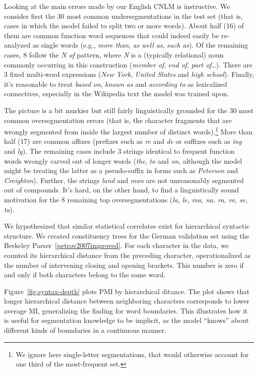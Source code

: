 Looking at the main errors made by our English CNLM is instructive. We
consider first the 30 most common undersegmentations in the test set
(that is, cases in which the model failed to split two or more
words). About half (16) of them are common function word sequences
that could indeed easily be re-analyzed as single words (e.g.,
\emph{more than}, \emph{as well as}, \emph{such as}). Of the remaining
cases, 8 follow the \emph{N of} pattern, where \emph{N} is a
(typically relational) noun commonly occurring in this construction
(\emph{member of}, \emph{end of}, \emph{part of}\ldots). There are 3
fixed multi-word expressions (\emph{New York}, \emph{United States}
and \emph{high school}). Finally, it's reasonable to treat \emph{based
  on}, \emph{known as} and \emph{according to} as lexicalized
connectives, especially in the Wikipedia text the model was trained
upon.

The picture is a bit murkier but still fairly linguistically grounded
for the 30 most common oversegmentation errors (that is, the character
fragments that are wrongly segmented from inside the largest number of
distinct words).\footnote{We ignore here single-letter segmentations,
  that would otherwise account for one third of the most-frequent
  set.}  More than half (17) are common affixes (prefixes such as
\emph{re} and \emph{de} or suffixes such as \emph{ing} and
\emph{ly}). The remaining cases include 3 strings identical to frequent
function words wrongly carved out of longer words (\emph{the},
\emph{to} and \emph{on}, although the model might be treating the
latter as a pseudo-suffix in forms such as \emph{Peterson} and
\emph{Creighton}). Further, the strings \emph{land} and \emph{man} are not
unreasonably segmented out of compounds. It's hard, on the other hand,
to find a linguistically sound motivation for the 8 remaining top
oversegmentations (\emph{la, le, ma, na, ra, ro, se, ta}).

We hypothesized that similar statistical correlates exist for hierarchical syntactic structure.
We created constituency trees for the German validation set using the Berkeley Parser~\ref{petrov2007improved}.
For each character in the data, we counted its hierarchical distance from the preceding character, operationalized as the number of intervening closing and opening brackets.
This number is zero if and only if both characters belong to the same word.

Figure~\ref{fig:syntax-depth} plots PMI by hierarchical ditance.
The plot shows that longer hierarchical distance between neighboring characters corresponds to lower average MI, generalizing the finding for word boundaries.
This illustrates how it is useful for segmentation knowledge to be implicit, as the model ``knows'' about different kinds of boundaries in a continuous manner.

